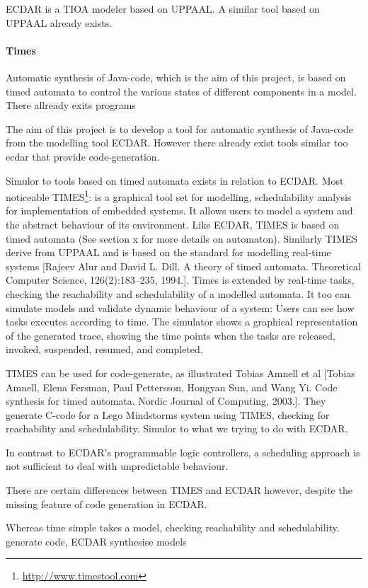 ECDAR is a TIOA modeler based on UPPAAL. A similar tool based on UPPAAL already
exists.

\paragraph{Times}
Automatic synthesis of Java-code, which is the aim of this project, is based on timed automata to control the various states of different components in a model. There allready exits programs

The aim of this project is to develop a tool for automatic synthesis of Java-code from the modelling tool ECDAR. However there already exist tools similar too ecdar that provide code-generation.

Simulor to tools based on timed automata exists in relation to ECDAR. Most noticeable TIMES\footnote{\url{http://www.timestool.com}}: is a graphical tool set for modelling, schedulability analysis for implementation of embedded systems. It allows users to model a system and the abstract behaviour of its environment. 
Like ECDAR, TIMES is based on timed automata (See section x for more details on automaton). Similarly TIMES derive from UPPAAL and is based on the standard for modelling real-time systems [Rajeev Alur and David L. Dill. A theory of timed automata. Theoretical Computer
Science, 126(2):183–235, 1994.].
Times is extended by real-time tasks, checking the reachability and schedulability of a modelled automata. It too can simulate models and validate dynamic behaviour of a system: Users can see how tasks executes according to time. The simulator shows a graphical representation of the generated trace, showing the time points when the tasks are released, invoked, suspended, resumed, and completed.

TIMES can be used for code-generate, as illustrated Tobias Amnell et al [Tobias Amnell, Elena Fersman, Paul Pettersson, Hongyan Sun, and Wang Yi. Code
synthesis for timed automata. Nordic Journal of Computing, 2003.]. They generate C-code for a Lego Mindstorms system using TIMES, checking for reachability and schedulability. Simulor to what we trying to do with ECDAR. 

In contrast to ECDAR's programmable logic controllers, a scheduling approach is not sufficient to deal with unpredictable behaviour.

There are certain differences between TIMES and ECDAR however, despite the missing feature of code generation in ECDAR. 

Whereas time simple takes a model, checking reachability and schedulability. generate code, ECDAR synthesise models
 

